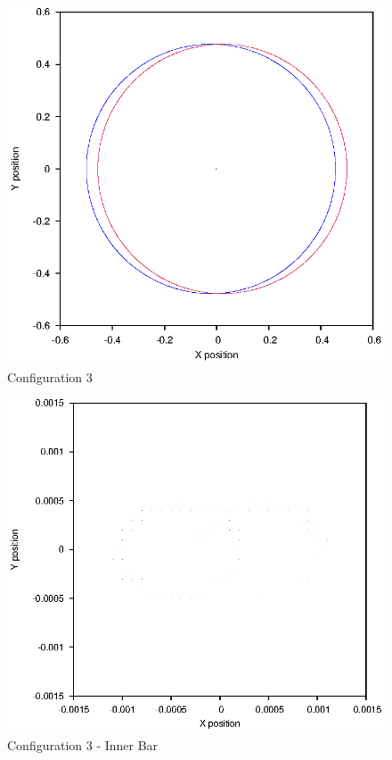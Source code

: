 \documentclass[a4paper,12pt]{article}
\begin{document}
\begin{figure}[H]
\centering
\includegraphics[width=.9\textwidth]{./2016results/003-5-001/Orbit.eps}
\caption{Configuration 3}
\label{fig:config3}
\end{figure}
\begin{figure}[H]
\centering
\includegraphics[width=.9\textwidth]{./2016results/003-5-001/Inner.eps}
\caption{Configuration 3 - Inner Bar}
\label{fig:config3i}
\end{figure}
\end{document}
